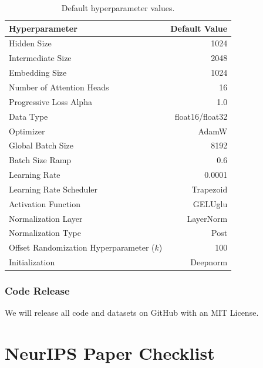 \documentclass{article}
\begin{document}
\begin{table}
    \centering
    \caption{Default hyperparameter values.}
    \begin{tabular}{lr} 
    \toprule
         Hyperparameter & Default Value\\
         \midrule
         Hidden Size& 1024\\ 
         Intermediate Size& 2048\\ 
         Embedding Size& 1024\\ 
         Number of Attention Heads& 16\\ 
         Progressive Loss Alpha \citep{bansal2022endtoend} & 1.0\\ 
         Data Type & float16/float32\\ 
         Optimizer& AdamW \citep{loshchilov2017decoupled}\\ 
         Global Batch Size& 8192\\ 
         Batch Size Ramp& 0.6\\ 
         Learning Rate&0.0001\\
         Learning Rate Scheduler&Trapezoid \citep{zhai2022scaling}\\
         Activation Function&GELUglu \citep{shazeer2020glu}\\ 
         Normalization Layer&LayerNorm \citep{ba2016layer}\\ 
         Normalization Type&Post\\ 
         Offset Randomization Hyperparameter (\(k\)) & 100 \\
         Initialization & Deepnorm \citep{wang_deepnet_2022}\\
        \bottomrule
    \end{tabular}
    
    \label{tab:hyperparams}
\end{table}

\subsubsection{Code Release}
We will release all code and datasets on GitHub with an MIT License. 


\clearpage
\newpage
\section*{NeurIPS Paper Checklist}
\end{document}
